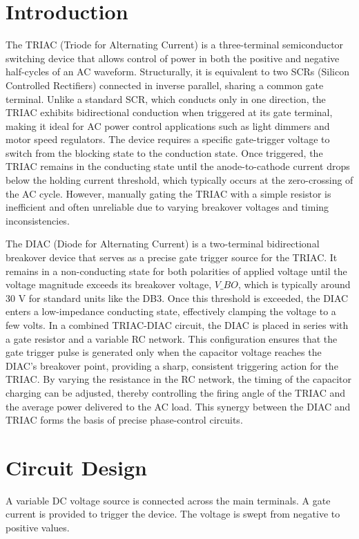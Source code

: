 \documentclass[12pt,a4paper]{article}
\begin{document}
\section{Introduction}
The TRIAC (Triode for Alternating Current) is a three-terminal semiconductor switching device that allows control of power in both the positive and negative half-cycles of an AC waveform. Structurally, it is equivalent to two SCRs (Silicon Controlled Rectifiers) connected in inverse parallel, sharing a common gate terminal. Unlike a standard SCR, which conducts only in one direction, the TRIAC exhibits bidirectional conduction when triggered at its gate terminal, making it ideal for AC power control applications such as light dimmers and motor speed regulators. The device requires a specific gate-trigger voltage to switch from the blocking state to the conduction state. Once triggered, the TRIAC remains in the conducting state until the anode-to-cathode current drops below the holding current threshold, which typically occurs at the zero-crossing of the AC cycle. However, manually gating the TRIAC with a simple resistor is inefficient and often unreliable due to varying breakover voltages and timing inconsistencies.

The DIAC (Diode for Alternating Current) is a two-terminal bidirectional breakover device that serves as a precise gate trigger source for the TRIAC. It remains in a non-conducting state for both polarities of applied voltage until the voltage magnitude exceeds its breakover voltage, $V\_{BO}$, which is typically around 30 V for standard units like the DB3. Once this threshold is exceeded, the DIAC enters a low-impedance conducting state, effectively clamping the voltage to a few volts. In a combined TRIAC-DIAC circuit, the DIAC is placed in series with a gate resistor and a variable RC network. This configuration ensures that the gate trigger pulse is generated only when the capacitor voltage reaches the DIAC's breakover point, providing a sharp, consistent triggering action for the TRIAC. By varying the resistance in the RC network, the timing of the capacitor charging can be adjusted, thereby controlling the firing angle of the TRIAC and the average power delivered to the AC load. This synergy between the DIAC and TRIAC forms the basis of precise phase-control circuits.



\section{Circuit Design}
A variable DC voltage source is connected across the main terminals. A gate current is provided to trigger the device. The voltage is swept from negative to positive values.
\end{document}
